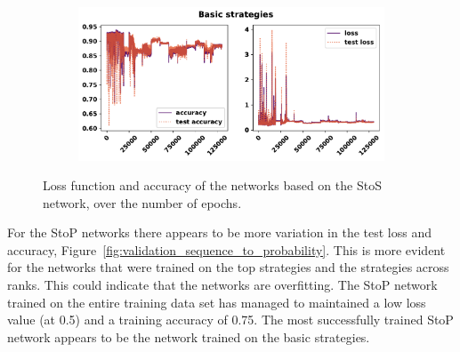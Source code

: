 \begin{figure}[!htbp]
\begin{subfigure}{\textwidth}
    \end{subfigure}
    \begin{subfigure}{\textwidth}
    \centering
    \includegraphics[width=.8\textwidth]{src/chapters/07/img/validation_plot_basic_strategies.pdf}
    \end{subfigure}
    \caption{Loss function and accuracy of the networks based on the StoS network,
    over the number of epochs.}\label{fig:validation_sequence_to_sequence}
\end{figure}

For the StoP networks there appears to be more variation in the test loss and
accuracy, Figure~\ref{fig:validation_sequence_to_probability}. This is more evident
for the networks that were trained on the top strategies and the strategies
across ranks. This could indicate that the networks are overfitting. The StoP
network trained on the entire training data set has managed to maintained
a low loss value (at 0.5) and a training accuracy of 0.75. The most successfully
trained StoP network appears to be the network trained on the basic strategies.

